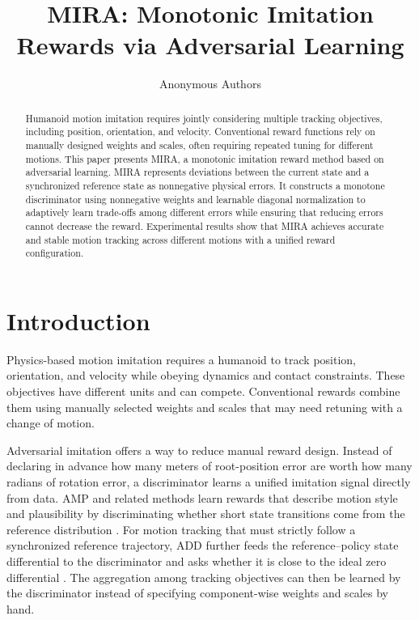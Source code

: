 \documentclass[letterpaper, 10pt, conference]{ieeeconf}
\title{\LARGE \bf MIRA: Monotonic Imitation Rewards via Adversarial Learning}
\author{Anonymous Authors}
\begin{document}
\maketitle
\thispagestyle{empty}
\pagestyle{empty}

\begin{abstract}
Humanoid motion imitation requires jointly considering multiple tracking
objectives, including position, orientation, and velocity. Conventional
reward functions rely on manually designed weights and scales, often
requiring repeated tuning for different motions. This paper presents MIRA,
a monotonic imitation reward method based on adversarial learning. MIRA
represents deviations between the current state and a synchronized reference
state as nonnegative physical errors. It constructs a monotone discriminator
using nonnegative weights and learnable diagonal normalization to adaptively
learn trade-offs among different errors while ensuring that reducing errors
cannot decrease the reward. Experimental results show that MIRA achieves
accurate and stable motion tracking across different motions with a unified
reward configuration.
\end{abstract}

\section{Introduction}
Physics-based motion imitation requires a humanoid to track position,
orientation, and velocity while obeying dynamics and contact constraints.
These objectives have different units and can compete. Conventional
rewards combine them using manually selected weights and scales that may
need retuning with a change of motion.

Adversarial imitation offers a way to reduce manual reward design.
Instead of declaring in advance how many meters of root-position error
are worth how many radians of rotation error, a discriminator learns a
unified imitation signal directly from data. AMP and related methods
learn rewards that describe motion style and plausibility by
discriminating whether short state transitions come from the reference
distribution \cite{peng2021amp}. For motion tracking that must strictly
follow a synchronized reference trajectory, ADD further feeds the
reference--policy state differential to the discriminator and asks
whether it is close to the ideal zero differential \cite{zhang2025add}.
The aggregation among tracking objectives can then be learned by the
discriminator instead of specifying component-wise weights and scales by
hand.
\end{document}
